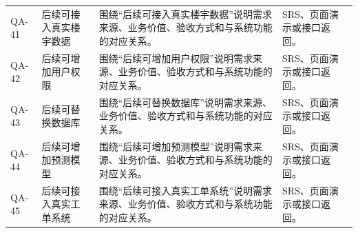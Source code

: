 \documentclass[12pt,a4paper]{ctexart}
\begin{document}
\begin{longtable}{L{1.7cm}L{4.4cm}L{6.0cm}L{3.4cm}}
QA-41 & 后续可接入真实楼宇数据 & 围绕“后续可接入真实楼宇数据”说明需求来源、业务价值、验收方式和与系统功能的对应关系。 & SRS、页面演示或接口返回。 \\
QA-42 & 后续可增加用户权限 & 围绕“后续可增加用户权限”说明需求来源、业务价值、验收方式和与系统功能的对应关系。 & SRS、页面演示或接口返回。 \\
QA-43 & 后续可替换数据库 & 围绕“后续可替换数据库”说明需求来源、业务价值、验收方式和与系统功能的对应关系。 & SRS、页面演示或接口返回。 \\
QA-44 & 后续可增加预测模型 & 围绕“后续可增加预测模型”说明需求来源、业务价值、验收方式和与系统功能的对应关系。 & SRS、页面演示或接口返回。 \\
QA-45 & 后续可接入真实工单系统 & 围绕“后续可接入真实工单系统”说明需求来源、业务价值、验收方式和与系统功能的对应关系。 & SRS、页面演示或接口返回。 \\
\bottomrule
\end{longtable}
\end{document}
